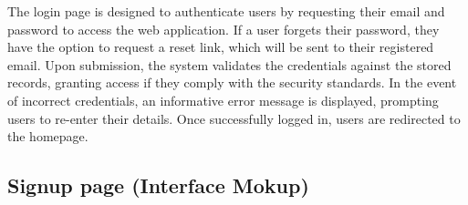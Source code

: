The login page is designed to authenticate users by requesting their email and password to access the web application. 
If a user forgets their password, they have the option to request a reset link, which will be sent to their registered email. 
Upon submission, the system validates the credentials against the stored records, granting access if they comply with the security standards. 
In the event of incorrect credentials, an informative error message is displayed, prompting users to re-enter their details. 
Once successfully logged in, users are redirected to the homepage.

\subsection{Signup page (Interface Mokup)}
